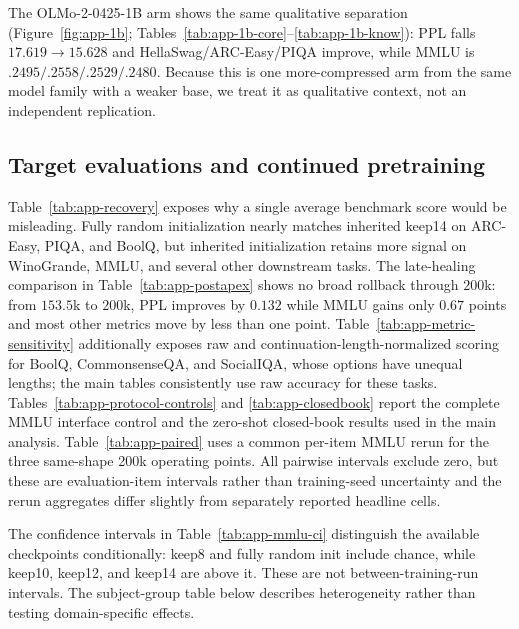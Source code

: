 The OLMo-2-0425-1B arm shows the same qualitative separation
(Figure~\ref{fig:app-1b}; Tables~\ref{tab:app-1b-core}--\ref{tab:app-1b-know}):
PPL falls $17.619\to15.628$ and HellaSwag/ARC-Easy/PIQA improve, while MMLU is
$.2495/.2558/.2529/.2480$. Because this is one more-compressed arm from the same
model family with a weaker base, we treat it as qualitative context, not an
independent replication.



\subsection{Target evaluations and continued pretraining}
\label{app:recovery}








Table~\ref{tab:app-recovery} exposes why a single average benchmark score would
be misleading. Fully random initialization nearly matches inherited keep14 on
ARC-Easy, PIQA, and BoolQ, but inherited initialization retains more signal on
WinoGrande, MMLU, and several other downstream tasks. The late-healing
comparison in Table~\ref{tab:app-postapex} shows no broad rollback through
$200$k: from $153.5$k to $200$k, PPL improves by $0.132$ while MMLU gains only
$0.67$ points and most other metrics move by less than one point.
Table~\ref{tab:app-metric-sensitivity} additionally exposes raw and
continuation-length-normalized scoring for BoolQ, CommonsenseQA, and SocialIQA,
whose options have unequal lengths; the main tables consistently use raw
accuracy for these tasks. Tables~\ref{tab:app-protocol-controls} and
\ref{tab:app-closedbook} report the complete MMLU interface control and the
zero-shot closed-book results used in the main analysis.
Table~\ref{tab:app-paired} uses a common per-item MMLU rerun for the three
same-shape 200k operating points. All pairwise intervals exclude zero, but these
are evaluation-item intervals rather than training-seed uncertainty and the
rerun aggregates differ slightly from separately reported headline cells.

The confidence intervals in Table~\ref{tab:app-mmlu-ci} distinguish the
available checkpoints conditionally: keep8 and fully random init include
chance, while keep10, keep12, and keep14 are above it. These are not
between-training-run intervals. The subject-group table below describes
heterogeneity rather than testing domain-specific effects.


